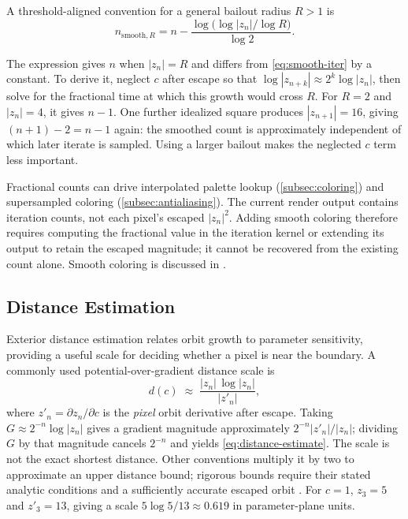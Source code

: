 A threshold-aligned convention for a general bailout radius $R>1$ is
\begin{equation}
  n_{\text{smooth},R} = n
    - \frac{\log\!\bigl(\log|z_n|/\log R\bigr)}{\log 2}.
  \label{eq:smooth-iter-general}
\end{equation}

The expression gives $n$ when $|z_n|=R$ and differs from
\eqref{eq:smooth-iter} by a constant.  To derive it, neglect $c$ after
escape so that $\log|z_{n+k}|\approx2^k\log|z_n|$, then solve for the
fractional time at which this growth would cross $R$.
For $R=2$ and $|z_n|=4$, it gives $n-1$.  One further idealized square
produces $|z_{n+1}|=16$, giving $(n+1)-2=n-1$ again: the smoothed
count is approximately independent of which later iterate is sampled.
Using a larger bailout makes the neglected $c$ term less important.

Fractional counts can drive interpolated palette lookup
(\cref{subsec:coloring}) and supersampled coloring
(\cref{subsec:antialiasing}).  The current render output contains iteration
counts, not each pixel's escaped $|z_n|^2$.  Adding smooth coloring therefore
requires computing the fractional value in the iteration kernel or extending
its output to retain the escaped magnitude; it cannot be recovered from the
existing count alone.  Smooth coloring is discussed in
\cite{HeilandAllenHybridDistance,WikipediaPlottingAlgorithms}.

\subsection{Distance Estimation}
\label{subsec:distance-estimation}

Exterior distance estimation relates orbit growth to parameter sensitivity,
providing a useful scale for deciding whether a pixel is near the boundary.
A commonly used potential-over-gradient distance scale is
\begin{equation}
  d(c) \;\approx\; \frac{|z_n|\,\log|z_n|}{|z'_n|},
  \label{eq:distance-estimate}
\end{equation}
where $z'_n = \partial z_n / \partial c$ is the \emph{pixel} orbit
derivative after escape.  Taking $G\approx2^{-n}\log|z_n|$ gives a
gradient magnitude approximately $2^{-n}|z'_n|/|z_n|$; dividing $G$ by
that magnitude cancels $2^{-n}$ and yields \eqref{eq:distance-estimate}.
The scale is not the exact shortest distance.  Other conventions multiply it
by two to approximate an upper distance bound; rigorous bounds require their
stated analytic conditions and a sufficiently accurate escaped orbit
\cite{HeilandAllenExteriorDistance}.
For $c=1$, $z_3=5$ and $z'_3=13$, giving a scale
$5\log5/13\approx0.619$ in parameter-plane units.

